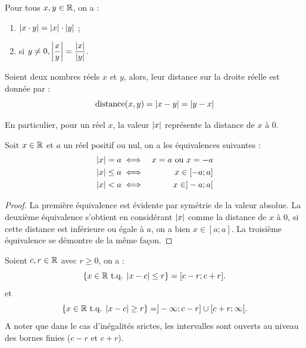 \documentclass[a4paper, 12pt]{report}
\begin{document}
\begin{thm}
Pour tous $x, y \in \R$, on a :
\begin{enumerate}[label=(\roman*)]
\item $\abs{x \cdot y} = \abs{x} \cdot \abs{y}$ ;
\item si $y \neq 0, \abs*{\dfrac{x}{y}} = \dfrac{\abs{x}}{\abs{y}}$.
\end{enumerate}
\end{thm}

\begin{thm}
Soient deux nombres réels $x$ et $y$, alors, leur distance sur la droite réelle est donnée par :
\[ \text{distance}(x,y) = \abs{x-y} = \abs{y-x} \]
\end{thm}

\begin{rmq}
En particulier, pour un réel $x$, la valeur $\abs{x}$ représente la distance de $x$ à 0.
\end{rmq}

\begin{prop}
Soit $x \in \R$ et $a$ un réel positif ou nul, on a les équivalences suivantes :
\begin{align*} 
\abs{x} = a & \iff & x = a \text{ ou } x=-a \\
\abs{x} \leq a & \iff & x \in [-a ; a ] \\
\abs{x} < a & \iff & x \in ]-a ; a [ 
\end{align*}
\end{prop}

\begin{proof}
La première équivalence est évidente par symétrie de la valeur absolue.  \newline
La deuxième équivalence s'obtient en considérant $\abs{x}$ comme la distance de $x$ à 0, 
si cette distance est inférieure ou égale à $a$, on a bien $x \in [a ; a]$. \newline
La troisième équivalence se démontre de la même façon.
\end{proof}

\begin{coro}
Soient $c, r \in \R$ avec $r \geq 0$, on a :
\[ \{ x \in \R \tq \abs{x-c} \leq r \} = [c-r ; c+r ] . \]
et 
\[ \{ x \in \R \tq \abs{x-c} \geq r \} = ]-\infty ; c-r ] \cup [ c+r ; \infty [ . \]
A noter que dans le cas d'inégalités srictes, les intervalles sont ouverts au niveau des bornes finies ($c-r$ et $c+r$).
\end{coro}
\end{document}
